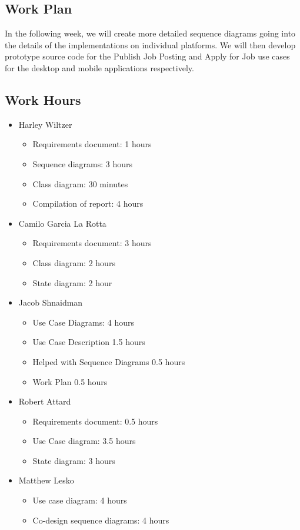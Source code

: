 \documentclass[12pt]{article}
\begin{document}
\begin{enumerate}
\begin{itemize}
        \end{itemize}
\end{enumerate}

\subsection{Work Plan}

In the following week, we will create more detailed sequence diagrams going into the details of the implementations on individual platforms. We will then develop prototype source code for the Publish Job Posting and Apply for Job use cases for the desktop and mobile applications respectively.

\subsection{Work Hours}

\begin{itemize}
    \item Harley Wiltzer
		\begin{itemize}
			\item Requirements document: 1 hours
			\item Sequence diagrams: 3 hours
			\item Class diagram: 30 minutes
			\item Compilation of report: 4 hours
		\end{itemize}
    \item Camilo Garcia La Rotta
    \begin{itemize}
        \item Requirements document: 3 hours
        \item Class diagram: 2 hours
        \item State diagram: 2 hour
    \end{itemize}
    \item Jacob Shnaidman
    \begin{itemize}
        \item Use Case Diagrams: 4 hours
        \item Use Case Description 1.5 hours
		\item Helped with Sequence Diagrams 0.5 hours
		\item Work Plan 0.5 hours
    \end{itemize}
    \item Robert Attard
    \begin{itemize}
        \item Requirements document: 0.5 hours
        \item Use Case diagram: 3.5 hours
        \item State diagram: 3 hours
    \end{itemize}
    \item Matthew Lesko
    \begin{itemize}
    	\item Use case diagram: 4 hours
    	\item Co-design sequence diagrams: 4 hours
    \end{itemize}
\end{itemize}
\end{document}
